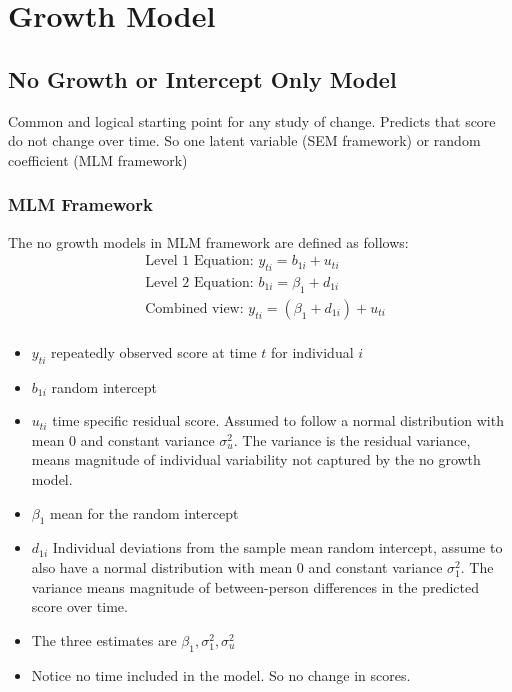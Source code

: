 \section{Growth Model} 


\subsection{No Growth or Intercept Only Model} 
Common and logical starting point for any study of change. Predicts that score do not change over time. So one latent variable (SEM framework) or random coefficient (MLM framework)


\subsubsection{MLM Framework} 
The no growth models in MLM framework are defined as follows: 
    \begin{align*}
        & \text{Level 1 Equation: } y_{ti} = b_{1i} + u_{ti} \\
        & \text{Level 2 Equation: } b_{1i} = \beta_1 + d_{1i} \\
        & \text{Combined view: } y_{ti}= (\beta_1 + d_{1i}) + u_{ti} \\
    \end{align*}
\begin{itemize}
    \item $y_{ti}$ repeatedly observed score at time $t$ for individual $i$ 
    \item $b_{1i}$ random intercept 
    \item $u_{ti}$ time specific residual score. Assumed to follow a normal distribution with mean 0 and constant variance $\sigma_u^2$. The variance is the residual variance, means magnitude of individual variability not captured by the no growth model. 
    \item $\beta_1$ mean for the random intercept 
    \item $d_{1i}$ Individual deviations from the sample mean random intercept, assume to also have a normal distribution with mean 0 and constant variance $\sigma_1^2$. The variance means magnitude of between-person differences in the predicted score over time. 
    \item The three estimates are $\beta_1, \sigma_1^2, \sigma_u^2$
    \item Notice no time included in the model. So no change in scores. 
\end{itemize}

